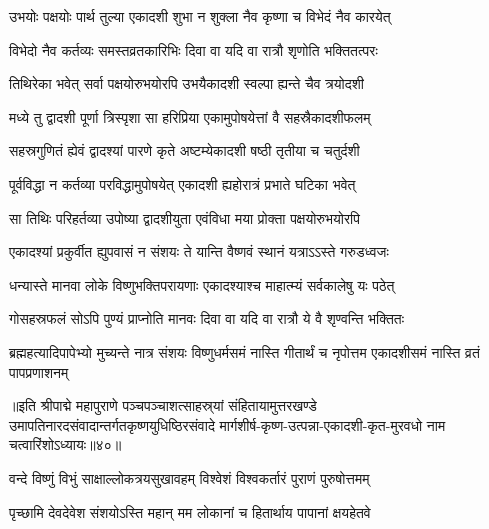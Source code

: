 \twolineshloka
{उभयोः पक्षयोः पार्थ तुल्या एकादशी शुभा}
{न शुक्ला नैव कृष्णा च विभेदं नैव कारयेत्}%

\twolineshloka
{विभेदो नैव कर्तव्यः समस्तव्रतकारिभिः}
{दिवा वा यदि वा रात्रौ शृणोति भक्तितत्परः}%

\twolineshloka
{तिथिरेका भवेत् सर्वा पक्षयोरुभयोरपि}
{उभयैकादशी स्वल्पा ह्यन्ते चैव त्रयोदशी}%

\twolineshloka
{मध्ये तु द्वादशी पूर्णा त्रिस्पृशा सा हरिप्रिया}
{एकामुपोषयेत्तां वै सहस्रैकादशीफलम्}%

\twolineshloka
{सहस्रगुणितं ह्येवं द्वादश्यां पारणे कृते}
{अष्टम्येकादशी षष्ठी तृतीया च चतुर्दशी}%

\twolineshloka
{पूर्वविद्धा न कर्तव्या परविद्धामुपोषयेत्}
{एकादशी ह्यहोरात्रं प्रभाते घटिका भवेत्}%

\twolineshloka
{सा तिथिः परिहर्तव्या उपोष्या द्वादशीयुता}
{एवंविधा मया प्रोक्ता पक्षयोरुभयोरपि}%

\twolineshloka
{एकादश्यां प्रकुर्वीत ह्युपवासं न संशयः}
{ते यान्ति वैष्णवं स्थानं यत्राऽऽस्ते गरुडध्वजः}%

\twolineshloka
{धन्यास्ते मानवा लोके विष्णुभक्तिपरायणाः}
{एकादश्याश्च माहात्म्यं सर्वकालेषु यः पठेत्}%

\twolineshloka
{गोसहस्रफलं सोऽपि पुण्यं प्राप्नोति मानवः}
{दिवा वा यदि वा रात्रौ ये वै शृण्वन्ति भक्तितः}%

\threelineshloka
{ब्रह्महत्यादिपापेभ्यो मुच्यन्ते नात्र संशयः}
{विष्णुधर्मसमं नास्ति गीतार्थं च नृपोत्तम}
{एकादशीसमं नास्ति व्रतं पापप्रणाशनम्}%

॥इति श्रीपाद्मे महापुराणे पञ्चपञ्चाशत्साहस्र्यां संहितायामुत्तरखण्डे उमापतिनारदसंवादान्तर्गतकृष्णयुधिष्ठिरसंवादे मार्गशीर्ष-कृष्ण-उत्पन्ना-एकादशी-कृत-मुरवधो नाम चत्वारिंशोऽध्यायः॥४०॥

\genMangalaShloka

\hyperref[sec:ekadashi_mahatmyam_padma_puranam]{\closesub}
\clearpage

\label{sec:padma-margashirsha-shukla-mokshada}

\ganapatyadiDhyanam
\padmaPuranam



\twolineshloka
{वन्दे विष्णुं विभुं साक्षाल्लोकत्रयसुखावहम्}
{विश्वेशं विश्वकर्तारं पुराणं पुरुषोत्तमम्}%

\twolineshloka
{पृच्छामि देवदेवेश संशयोऽस्ति महान् मम}
{लोकानां च हितार्थाय पापानां क्षयहेतवे}%

